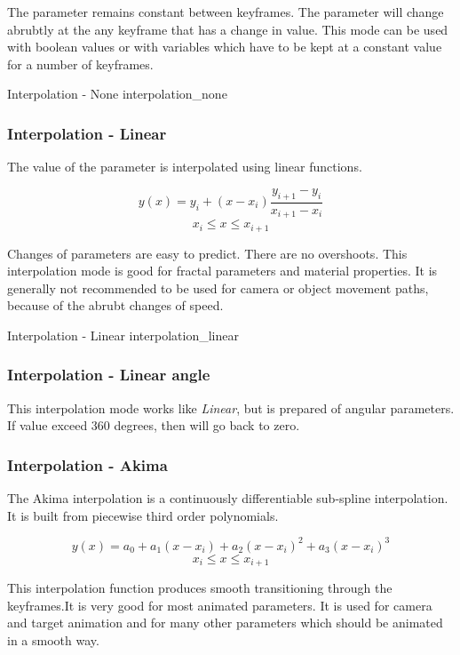 The parameter remains constant between keyframes. The parameter will change abrubtly at the any keyframe that has a change in value. This mode can be used with boolean values or with variables
which have to be kept at a constant value for a number of keyframes.

{Interpolation - None}
{interpolation_none}

\subsubsection{Interpolation - Linear}\label{interpolation-linear}

The value of the parameter is interpolated using linear functions.

\[ y(x) = y_i + (x - x_i) \frac{y_{i+1} - y_i}{x_{i+1} - x_i}\] \[x_i  \leq x
\leq x_{i+1}\]

Changes of parameters are easy to predict. There are no overshoots. This
interpolation mode is good for fractal parameters and material properties. It is
generally not recommended to be used for camera or object movement paths, because of the abrubt changes of speed.

{Interpolation - Linear}
{interpolation_linear}

\subsubsection{Interpolation - Linear angle}\label{interpolation-linear-angle}

This interpolation mode works like \emph{Linear}, but is prepared of angular
parameters. If value exceed 360 degrees, then will go back to zero.

\subsubsection{Interpolation - Akima}\label{interpolation-akima}

The Akima interpolation is a continuously differentiable sub-spline
interpolation. It is built from piecewise third order polynomials.

\[ y(x) = a_0 + a_1 (x - x_i) + a_2 (x - x_i)^2 + a_3 (x - x_i)^3\] \[x_i  \leq
x \leq x_{i+1}\]

This interpolation function produces smooth transitioning through the keyframes.It is very good for most animated parameters. It 
is used for camera and target animation and for many other parameters which
should be animated in a smooth way.

